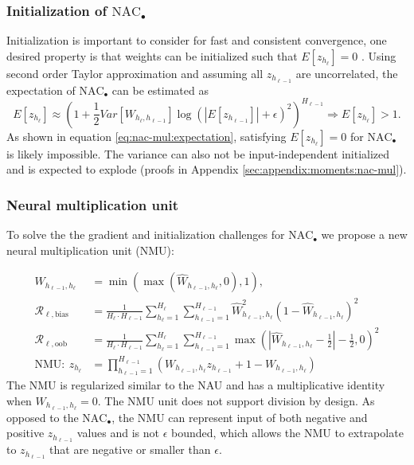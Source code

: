 \subsubsection{Initialization of $\mathrm{NAC}_{\bullet}$}
Initialization is important to consider for fast and consistent convergence, one desired property is that weights can be initialized such that $E[z_{h_\ell}] = 0$ \cite{glorot-initialization}. Using second order Taylor approximation and assuming all $z_{h_{\ell-1}}$ are uncorrelated, the expectation of $\mathrm{NAC}_{\bullet}$ can be estimated as
\begin{equation}
E[z_{h_\ell}] \approx \left(1 + \frac{1}{2} Var[W_{h_\ell, h_{\ell-1}}] \log(|E[z_{h_{\ell-1}}]| + \epsilon)^2\right)^{H_{\ell-1}} \Rightarrow E[z_{h_\ell}] > 1.
\label{eq:nac-mul:expectation}
\end{equation}
As shown in equation \ref{eq:nac-mul:expectation}, satisfying $E[z_{h_\ell}] = 0$ for $\mathrm{NAC}_{\bullet}$ is likely impossible. The variance can also not be input-independent initialized and is expected to explode (proofs in Appendix \ref{sec:appendix:moments:nac-mul}).

\subsubsection{Neural multiplication unit}
To solve the the gradient and initialization challenges for $\mathrm{NAC}_{\bullet}$ we propose a new neural multiplication unit (NMU):

\begin{align}
W_{h_{\ell-1},h_\ell} &= \min(\max(\hat{W}_{h_{\ell-1},h_\ell}, 0), 1), \\
\mathcal{R}_{\ell,\mathrm{bias}} &= \frac{1}{H_\ell \cdot H_{\ell-1}} \sum_{h_\ell=1}^{H_\ell} \sum_{h_{\ell-1}=1}^{H_{\ell-1}} \hat{W}_{h_{\ell-1},h_\ell}^2 (1 - \hat{W}_{h_{\ell-1},h_\ell})^2 \\
\mathcal{R}_{\ell,\mathrm{oob}} &= \frac{1}{H_\ell \cdot H_{\ell-1}} \sum_{h_\ell=1}^{H_\ell} \sum_{h_{\ell-1}=1}^{H_{\ell-1}} \max\left(\left|\hat{W}_{h_{\ell-1},h_\ell} - \frac{1}{2}\right| - \frac{1}{2}, 0\right)^2 \\
\textrm{NMU}:\ z_{h_\ell} &= \prod_{h_{\ell-1}=1}^{H_{\ell-1}} \left(W_{h_{\ell-1},h_\ell} z_{h_{\ell-1}} + 1 - W_{h_{\ell-1},h_\ell} \right) \label{eq:nmu-defintion}
\end{align}
The NMU is regularized similar to the NAU and has a multiplicative identity when $W_{h_{\ell-1},h_\ell}=0$.
The NMU unit does not support division by design.
As opposed to the $\mathrm{NAC}_{\bullet}$, the NMU can represent input of both negative and positive $z_{h_{\ell-1}}$ values and is not $\epsilon$ bounded, which allows the NMU to extrapolate to $z_{h_{\ell-1}}$ that are negative or smaller than $\epsilon$.

